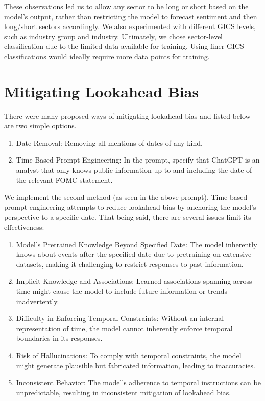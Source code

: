 \documentclass[11pt]{article}
\begin{document}
These observations led us to allow any sector to be long or short based on the model's output, 
rather than restricting the model to forecast sentiment and then long/short sectors accordingly. 
We also experimented with different GICS levels, such as industry group and industry. Ultimately, 
we chose sector-level classification due to the limited data available for training. Using 
finer GICS classifications would ideally require more data points for training.
 

\section{Mitigating Lookahead Bias}
There were many proposed ways of mitigating lookahead bias and listed below are two simple 
options. 
\begin{enumerate}
    \item Date Removal: Removing all mentions of dates of any kind.
    \item Time Based Prompt Engineering: In the prompt, specify that ChatGPT is an analyst that 
    only knows public information up to and including the date of the relevant FOMC statement.
\end{enumerate}

We implement the second method (as seen in the above prompt). Time-based prompt engineering
attempts to reduce lookahead bias by anchoring the model's perspective to a specific date. 
That being said, there are several issues limit its effectiveness:

\begin{enumerate}
    \item Model's Pretrained Knowledge Beyond Specified Date: The model inherently knows about events after the specified date due to pretraining on extensive datasets, making it challenging to restrict responses to past information.
    
    \item Implicit Knowledge and Associations: Learned associations spanning across time might cause the model to include future information or trends inadvertently.
    
    \item Difficulty in Enforcing Temporal Constraints: Without an internal representation of time, the model cannot inherently enforce temporal boundaries in its responses.
    
    \item Risk of Hallucinations: To comply with temporal constraints, the model might generate plausible but fabricated information, leading to inaccuracies.
    
    \item Inconsistent Behavior: The model's adherence to temporal instructions can be unpredictable, resulting in inconsistent mitigation of lookahead bias.
\end{enumerate}
\end{document}
